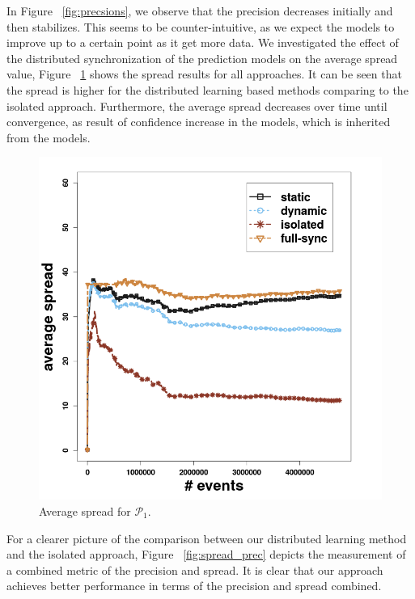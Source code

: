\par In Figure ~\ref{fig:precsions}, we observe that the precision decreases initially and then stabilizes. This seems to be counter-intuitive, as we expect the models to improve up to a certain point as it get more data. We  investigated the effect of the distributed synchronization of the prediction models on the average spread value, Figure  ~\ref{fig:spread}  shows the spread results for all approaches. It can be seen that the spread is higher for the distributed learning based methods comparing to the isolated approach. Furthermore, the average spread decreases over time until convergence, as result of confidence increase in the models, which is inherited from the \pmcmr models. 

\begin{center}
	
	\begin{figure}[H]
		\centering
		\includegraphics[width=\textwidth,height=.65\textheight]{chapters/figures/synopses/p1_spread_100_2_08.png}
		
		\caption{Average spread for $\mathcal{P}_1$.}
		\label{fig:spread}
	\end{figure}
\end{center}


\par For a clearer picture of the comparison between our distributed learning method and the isolated approach, Figure ~\ref{fig:spread_prec} depicts the measurement of a combined metric of the precision and spread. It is clear that our approach achieves better performance in terms of the precision and spread combined.  

